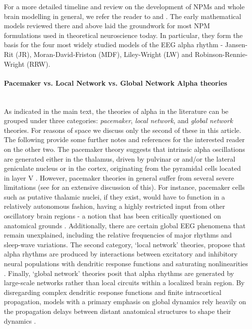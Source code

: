 \documentclass[12pt,twoside]{article}
\begin{document}
For a more detailed timeline and review on the development of NPMs and whole brain modelling in general, we refer the reader to \citet{griffiths2022whole} and \citet{chow2020before}. The early mathematical models reviewed there and above laid the groundwork for most NPM formulations used in theoretical neuroscience today. In particular, they form the basis for the four most widely studied models of the EEG alpha rhythm - Jansen-Rit (JR), Moran-David-Friston (MDF), Liley-Wright (LW) and Robinson-Rennie-Wright (RRW). 


\paragraph{Pacemaker vs. Local Network vs. Global Network Alpha theories}~\\
As indicated in the main text, the theories of alpha in the literature can be grouped under three categories: \textit{pacemaker}, \textit{local network}, and \textit{global network} theories. For reasons of space we discuss only the second of these in this article. The following provide some further notes and references for the interested reader on the other two. 
The pacemaker theory suggests that intrinsic alpha oscillations are generated either in the thalamus, driven by pulvinar or and/or the lateral geniculate nucleus \citep{saalmann2012pulvinar, lHorincz2009temporal, hughes2011thalamic} or in the cortex, originating from the pyramidal cells located in layer V \citep{da1991neural, connors1997making, bollimunta2008neuronal}. However, pacemaker theories in general suffer from several severe limitations (see \citealt{nunez2006electric} for an extensive discussion of this). For instance, pacemaker cells such as putative thalamic nuclei, if they exist, would have to function in a relatively autonomous fashion, having a highly restricted input from other oscillatory brain regions - a notion that has been critically questioned on anatomical grounds \citep{lopes1998dynamics, steriade2005cellular}. Additionally, there are certain global EEG phenomena that remain unexplained, including the relative frequencies of major rhythms and sleep-wave variations. The second category, `local network' theories,  propose that alpha rhythms are produced by interactions between excitatory and inhibitory neural populations with dendritic response functions and saturating nonlinearities \citep{valdes2010white}. Finally, `global network' theories posit that alpha rhythms are generated by large-scale networks rather than local circuits within a localized brain region. By disregarding complex dendritic response functions and finite intracortical propagation, models with a primary emphasis on global dynamics rely heavily on the propagation delays between distant anatomical structures to shape their dynamics \citep{nunez1995neocortical, nunez2006theoretical, valdes2010white}. 





\end{document}
